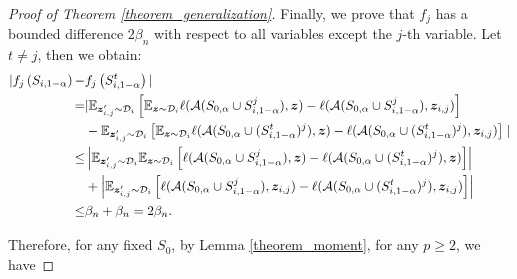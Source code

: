 \begin{proof}[Proof of Theorem \ref{theorem_generalization}]
Finally, we prove that $f_j$ has a bounded difference $2\beta_{n}$ with respect to all variables except the $j$-th variable. Let $t\neq j$, then we obtain:
\begin{align}
|f_j\left(S_{i,1-\alpha}\right)-&f_j\left(S_{i,1-\alpha}^t\right)|\notag\\
=&|\mathbb{E}_{\boldsymbol{z}_{i,j}'\sim\mathcal{D}_i}\left[\mathbb{E}_{\boldsymbol{z}\sim\mathcal{D}_i}\ell(\mathcal{A}(S_{0,\alpha}\cup S_{i,1-\alpha}^j),\boldsymbol{z})-\ell(\mathcal{A}(S_{0,\alpha}\cup S_{i,1-\alpha}^j),\boldsymbol{z}_{i,j})\right] \notag\\
& -\mathbb{E}_{\boldsymbol{z}_{i,j}'\sim\mathcal{D}_i}\left[\mathbb{E}_{\boldsymbol{z}\sim\mathcal{D}_i}\ell(\mathcal{A}(S_{0,\alpha}\cup (S_{i,1-\alpha}^t)^j),\boldsymbol{z})-\ell(\mathcal{A}(S_{0,\alpha}\cup (S_{i,1-\alpha}^t)^j),\boldsymbol{z}_{i,j})\right]\mid \notag \\
\leq & \left|\mathbb{E}_{\boldsymbol{z}_{i,j}^{\prime} \sim \mathcal{D}_i} \mathbb{E}_{\boldsymbol{z} \sim \mathcal{D}_i}\left[\ell(\mathcal{A}(S_{0,\alpha}\cup S_{i,1-\alpha}^j),\boldsymbol{z})-\ell(\mathcal{A}(S_{0,\alpha}\cup (S_{i,1-\alpha}^t)^j),\boldsymbol{z})\right]\right|\notag \\
& +\left|\mathbb{E}_{\boldsymbol{z}_{i,j}^{\prime} \sim \mathcal{D}_i}\left[\ell(\mathcal{A}(S_{0,\alpha} \cup S_{i, 1-\alpha}^j), \boldsymbol{z}_{i,j})-\ell(\mathcal{A}(S_{0,\alpha} \cup(S_{i,1-\alpha}^t)^j), \boldsymbol{z}_{i,j})\right]\right|\notag \\
\leq & \beta_{n}+\beta_{n}=2 \beta_{n} . \notag
\end{align}

Therefore, for any fixed $S_0$, by Lemma \ref{theorem_moment}, for any $p \geq 2$, we have


\end{proof}
